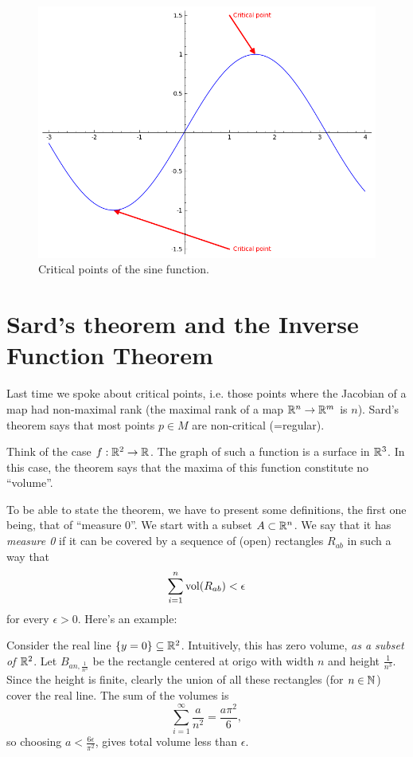 \documentclass[11pt, english]{article}
\begin{document}
\begin{figure}[ht]
\begin{center}
\includegraphics[scale=0.7]{criticalpoints}
\end{center}
\caption{Critical points of the sine function.}
\label{criticalpoints}
\end{figure}

\pagebreak
\section{Sard's theorem and the Inverse Function Theorem}

Last time we spoke about critical points, i.e. those points where the Jacobian of a map had non-maximal rank (the maximal rank of a map $\mathbb{R}^n \to \mathbb{R}^m$ is $n$). Sard's theorem says that most points $p \in M$ are non-critical (=regular).

Think of the case $f:\mathbb{R}^2 \to \mathbb{R}$. The graph of such a function is a surface in $\mathbb{R}^3$. In this case, the theorem says that the maxima of this function constitute no ``volume''.

To be able to state the theorem, we have to present some definitions, the first one being, that of ``measure $0$''. We start with a subset $A \subset \mathbb{R}^n$. We say that it has \emph{measure 0} if it can be covered by a sequence of (open) rectangles $R_{ab}$ in such a way that
\[
\sum_{i=1}^n \operatorname{\mathrm{vol}}(R_{ab}) < \epsilon
\]
for every $\epsilon > 0$. Here's an example:

\begin{example}
Consider the real line $\{ y = 0 \} \subseteq \mathbb{R}^2$. Intuitively, this has zero volume, \emph{as a subset of $\mathbb{R}^2$}. Let $B_{an,{\frac{1}{n^3}}}$ be the rectangle centered at origo with width $n$ and height $\frac{1}{n^3}$.  Since the height is finite, clearly the union of all these rectangles (for $n \in \mathbb{N}$) cover the real line.  The sum of the volumes is
\[
\sum_{i=1}^\infty \frac{a}{n^2} = \frac{a \pi^2}{6},
\]
so choosing $a < \frac{6 \epsilon}{\pi^2}$, gives total volume less than $\epsilon$.
\end{example}
\end{document}
